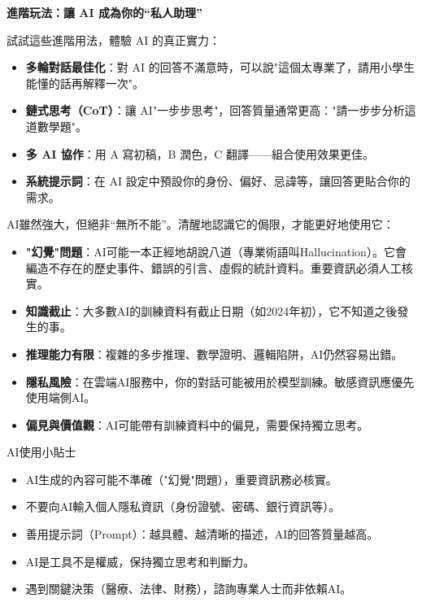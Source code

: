 \textbf{進階玩法：讓 AI 成為你的“私人助理”}\par

試試這些進階用法，體驗 AI 的真正實力：

\begin{itemize}
  \item \textbf{多輪對話最佳化}：對 AI 的回答不滿意時，可以說"這個太專業了，請用小學生能懂的話再解釋一次"。
  \item \textbf{鏈式思考（CoT）}：讓 AI"一步步思考"，回答質量通常更高："請一步步分析這道數學題"。
  \item \textbf{多 AI 協作}：用 A 寫初稿，B 潤色，C 翻譯——組合使用效果更佳。
  \item \textbf{系統提示詞}：在 AI 設定中預設你的身份、偏好、忌諱等，讓回答更貼合你的需求。
\end{itemize}


AI雖然強大，但絕非“無所不能”。清醒地認識它的侷限，才能更好地使用它：

\begin{itemize}
  \item \textbf{"幻覺"問題}：AI可能一本正經地胡說八道（專業術語叫Hallucination）。它會編造不存在的歷史事件、錯誤的引言、虛假的統計資料。重要資訊必須人工核實。
  \item \textbf{知識截止}：大多數AI的訓練資料有截止日期（如2024年初），它不知道之後發生的事。
  \item \textbf{推理能力有限}：複雜的多步推理、數學證明、邏輯陷阱，AI仍然容易出錯。
  \item \textbf{隱私風險}：在雲端AI服務中，你的對話可能被用於模型訓練。敏感資訊應優先使用端側AI。
  \item \textbf{偏見與價值觀}：AI可能帶有訓練資料中的偏見，需要保持獨立思考。
\end{itemize}

\begin{tcbinfo}{AI使用小貼士}
\begin{itemize}
  \item AI生成的內容可能不準確（"幻覺"問題），重要資訊務必核實。
  \item 不要向AI輸入個人隱私資訊（身份證號、密碼、銀行資訊等）。
  \item 善用提示詞（Prompt）：越具體、越清晰的描述，AI的回答質量越高。
  \item AI是工具不是權威，保持獨立思考和判斷力。
  \item 遇到關鍵決策（醫療、法律、財務），諮詢專業人士而非依賴AI。
\end{itemize}

\end{tcbinfo}

